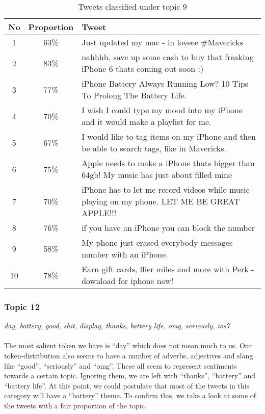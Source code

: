 \begin{table}[H]
  \begin{tabular}{c c p{13cm}} \toprule
    No & Proportion & Tweet \\ \midrule
    1  & 63\%       & Just updated my mac - in loveee \#Mavericks \\ \midrule
    2  & 83\%       & nahhhh, save up some cash to buy that freaking iPhone 6 thats coming out soon :) \\ \midrule
    3  & 77\%       & iPhone Battery Always Running Low? 10 Tips To Prolong The Battery Life. \\ \midrule
    4  & 70\%       & I wish I could type my mood into my iPhone and it would make a playlist for me. \\ \midrule
    5  & 67\%       & I would like to tag items on my iPhone and then be able to search tags, like in Mavericks. \\ \midrule
    6  & 75\%       & Apple needs to make a iPhone thats bigger than 64gb! My music has just about filled mine \\ \midrule
    7  & 70\%       & iPhone has to let me record videos while music playing on my phone. LET ME BE GREAT APPLE!!! \\ \midrule
    8  & 76\%       & if you have an iPhone you can block the number \\ \midrule
    9  & 58\%       & My phone just erased everybody messages number with an iPhone. \\ \midrule
    10 & 78\%       & Earn gift cards, flier miles and more with Perk - download for iphone now! \\ \bottomrule
  \end{tabular}
  \caption{Tweets classified under topic 9}
  \label{tab:tweets_under_9}
\end{table}



\subsubsection{Topic 12}
\label{sec:topic_12}
\textit{day, battery, good, shit, display, thanks, battery life, omg, seriously, ios7}\\\\
The most salient token we have is ``day'' which does not mean much to us. Our token-distribution
also seems to have a number of adverbs, adjectives and slang like ``good'', ``seriously'' and
``omg''. These all seem to represent sentiments towards a certain topic. Ignoring them, we are left
with ``thanks'', ``battery'' and ``battery life''. At this point, we could postulate that most of
the tweets in this category will have a ``battery'' theme. To confirm this, we take a look at some
of the tweets with a fair proportion of the topic.


